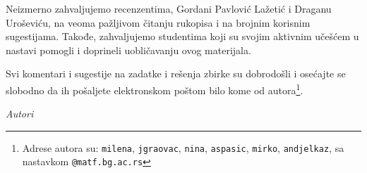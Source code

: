 
Neizmerno zahvaljujemo recenzentima, Gordani Pavlović Lažetić i Draganu Uroševiću, na veoma pažljivom čitanju rukopisa i na brojnim korisnim sugestijama. Takođe, zahvaljujemo studentima koji su svojim aktivnim učešćem u nastavi pomogli i doprineli uobličavanju ovog materijala. 

Svi komentari i sugestije na zadatke i rešenja zbirke su dobrodošli i osećajte se slobodno da ih pošaljete elektronskom poštom bilo kome od autora\footnote{Adrese autora su: \texttt{milena}, \texttt{jgraovac}, \texttt{nina}, \texttt{aspasic}, \texttt{mirko}, \texttt{andjelkaz}, sa nastavkom \texttt{@matf.bg.ac.rs}}. 



\bigskip

\begin{flushright}
{\em Autori}
\end{flushright}
